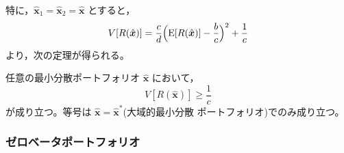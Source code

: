 特に，$\hat{\bm{x}}_1 = \hat{\bm{x}}_2 = \hat{\bm{x}}$ とすると，
\begin{equation}
V[R(\hat{\bm{x}})]
= \frac{c}{d}\Bigl(\mathrm{E}[R(\hat{\bm{x}})] - \frac{b}{c}\Bigr)^2 + \frac{1}{c}
\label{eq:mk-var}
\end{equation}
より，次の定理が得られる。

\begin{theorem}
任意の最小分散ポートフォリオ $\hat{\bm{x}}$ において，
\begin{equation}
V[R(\hat{\bm{x}})] \geq \frac{1}{c}
\end{equation}
が成り立つ。等号は $\hat{\bm{x}} = \hat{\bm{x}}^*$(大域的最小分散
ポートフォリオ)でのみ成り立つ。
\end{theorem}

\vspace{18pt}

\subsubsection{ゼロベータポートフォリオ}

